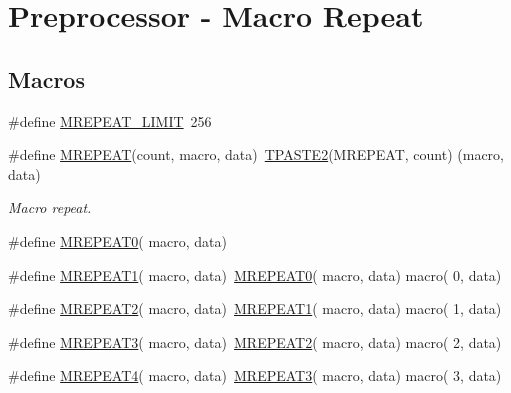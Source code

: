 \hypertarget{group__group__sam0__utils__mrepeat}{}\section{Preprocessor -\/ Macro Repeat}
\label{group__group__sam0__utils__mrepeat}
\subsection*{Macros}
\begin{DoxyCompactItemize}
\item 
\#define \mbox{\hyperlink{group__group__sam0__utils__mrepeat_gab145883b0377c1a0065481f8609da400}{M\+R\+E\+P\+E\+A\+T\+\_\+\+L\+I\+M\+IT}}~256
\item 
\#define \mbox{\hyperlink{group__group__sam0__utils__mrepeat_ga42db715ccb877ca87d7903f5783bd104}{M\+R\+E\+P\+E\+AT}}(count,  macro,  data)~\mbox{\hyperlink{group__group__sam0__utils__tpaste_ga55fb148844f5ba993a992b609728e82e}{T\+P\+A\+S\+T\+E2}}(M\+R\+E\+P\+E\+AT, count) (macro, data)
\begin{DoxyCompactList}\small\item\em Macro repeat. \end{DoxyCompactList}\item 
\#define \mbox{\hyperlink{group__group__sam0__utils__mrepeat_ga490ecc29badbd5a97ed805749a450089}{M\+R\+E\+P\+E\+A\+T0}}( macro,  data)
\item 
\#define \mbox{\hyperlink{group__group__sam0__utils__mrepeat_ga3abc77fc72ae2dcdd787ac5f2468312e}{M\+R\+E\+P\+E\+A\+T1}}( macro,  data)~\mbox{\hyperlink{group__group__sam0__utils__mrepeat_ga490ecc29badbd5a97ed805749a450089}{M\+R\+E\+P\+E\+A\+T0}}(  macro, data)   macro(  0, data)
\item 
\#define \mbox{\hyperlink{group__group__sam0__utils__mrepeat_gad5dcb0f9f91771b2e3e42b48d347cb76}{M\+R\+E\+P\+E\+A\+T2}}( macro,  data)~\mbox{\hyperlink{group__group__sam0__utils__mrepeat_ga3abc77fc72ae2dcdd787ac5f2468312e}{M\+R\+E\+P\+E\+A\+T1}}(  macro, data)   macro(  1, data)
\item 
\#define \mbox{\hyperlink{group__group__sam0__utils__mrepeat_ga94781fc45639d838e3f23e352aa3dc63}{M\+R\+E\+P\+E\+A\+T3}}( macro,  data)~\mbox{\hyperlink{group__group__sam0__utils__mrepeat_gad5dcb0f9f91771b2e3e42b48d347cb76}{M\+R\+E\+P\+E\+A\+T2}}(  macro, data)   macro(  2, data)
\item 
\#define \mbox{\hyperlink{group__group__sam0__utils__mrepeat_gaf5ec86cd52c8433725c3b7d756c70a49}{M\+R\+E\+P\+E\+A\+T4}}( macro,  data)~\mbox{\hyperlink{group__group__sam0__utils__mrepeat_ga94781fc45639d838e3f23e352aa3dc63}{M\+R\+E\+P\+E\+A\+T3}}(  macro, data)   macro(  3, data)

\end{DoxyCompactItemize}
